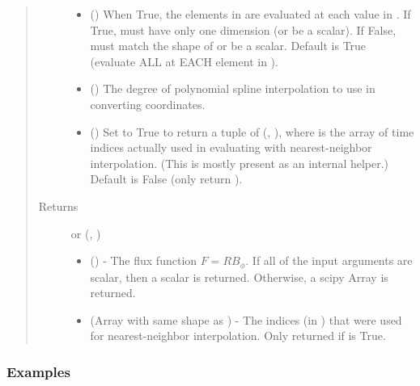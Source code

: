 \documentclass[letterpaper,10pt,english]{sphinxmanual}
\begin{document}
\begin{fulllineitems}
\begin{fulllineitems}
\begin{quote}
\begin{description}
\begin{itemize}
\item {} 
 () \textendash{} When True, the elements in  are evaluated
at each value in . If True,  must have only one dimension
(or be a scalar). If False,  must match the shape of 
or be a scalar. Default is True (evaluate ALL  at EACH
element in ).

\item {} 
 () \textendash{} The degree of polynomial spline interpolation to
use in converting coordinates.

\item {} 
 () \textendash{} Set to True to return a tuple of (,
), where  is the array of time indices
actually used in evaluating  with nearest-neighbor
interpolation. (This is mostly present as an internal helper.)
Default is False (only return ).

\end{itemize}

\item[{Returns}] \leavevmode

 or (, )
\begin{itemize}
\item {} 
 () - The flux function \(F=RB_{\phi}\).
If all of the input arguments are scalar, then a scalar is returned.
Otherwise, a scipy Array is returned.

\item {} 
 (Array with same shape as ) - The indices
(in ) that were used for
nearest-neighbor interpolation. Only returned if  is
True.

\end{itemize}


\end{description}\end{quote}
\subsubsection*{Examples}


\end{fulllineitems}
\end{fulllineitems}
\end{document}

